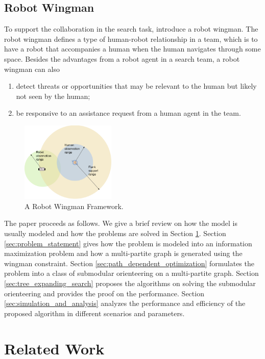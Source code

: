 \documentclass[12pt]{article}
\begin{document}
\subsection{Robot Wingman}
\label{subsec:robot_wingman}

To support the collaboration in the search task, \cite{goodrich2013toward} introduce a robot wingman. 
The robot wingman defines a type of human-robot relationship in a team, which is to have a robot that accompanies a human when the human navigates through some space.
Besides the advantages from a robot agent in a search team, a robot wingman can also
\begin{enumerate}
\item detect threats or opportunities that may be relevant to the human but likely not seen by the human;
\item be responsive to an assistance request from a human agent in the team. 
\end{enumerate}

\begin{figure}[htbp]
\centering
\includegraphics[width=0.4\textwidth]{./images/Wingman.pdf}
\caption{A Robot Wingman Framework.}
\label{fig:Wingman}
\end{figure}

The paper proceeds as follows.
We give a brief review on how the model is usually modeled and how the problems are solved in Section \ref{sec:related_work}.
Section \ref{sec:problem_statement} gives how the problem is modeled into an information maximization problem and how a multi-partite graph is generated using the wingman constraint.
Section \ref{sec:path_dependent_optimization} formulates the problem into a class of submodular orienteering on a multi-partite graph.
Section \ref{sec:tree_expanding_search} proposes the algorithms on solving the submodular orienteering and provides the proof on the  performance.
Section \ref{sec:simulation_and_analysis} analyzes the performance and efficiency of the proposed algorithm in different scenarios and parameters.

\section{Related Work}
\label{sec:related_work}
\end{document}
